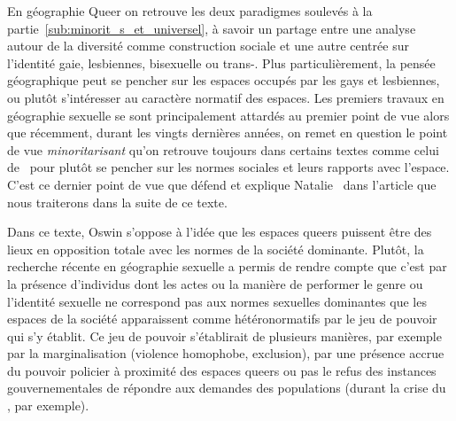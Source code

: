 
En géographie Queer on retrouve les deux paradigmes soulevés à la partie~\ref{sub:minorit_s_et_universel}, à savoir un partage entre une analyse autour de la diversité comme construction sociale et une autre centrée sur l'identité gaie, lesbiennes, bisexuelle ou trans-. 
Plus particulièrement, la pensée géographique peut se pencher sur les espaces occupés par les gays et lesbiennes, ou plutôt s'intéresser au caractère normatif des espaces. 
Les premiers travaux en géographie sexuelle se sont principalement attardés au premier point de vue alors que récemment, durant les vingts dernières années, on remet en question le point de vue \emph{minoritarisant} qu'on retrouve toujours dans certains textes comme celui de~\citet{Sinfield1996} pour plutôt se pencher sur les normes sociales et leurs rapports avec l'espace. 
C'est ce dernier point de vue que défend et explique Natalie~\citet{Oswin2008} dans l'article  que nous traiterons dans la suite de ce texte.

Dans ce texte, Oswin s'oppose à l'idée que les espaces queers puissent être des lieux en opposition totale avec les normes de la société dominante. 
Plutôt, la recherche récente en géographie sexuelle a permis de rendre compte que c'est par la présence d'individus dont les actes ou la manière de performer le genre ou l'identité sexuelle ne correspond pas aux normes sexuelles dominantes que les espaces de la société apparaissent comme hétéronormatifs par le jeu de pouvoir qui s'y établit. 
Ce jeu de pouvoir s'établirait de plusieurs manières, par exemple par la marginalisation (violence homophobe, exclusion), par une présence accrue du pouvoir policier à proximité des espaces queers ou pas le refus des instances gouvernementales de répondre aux demandes des populations \lgbt{} (durant la crise du \sida, par exemple).


